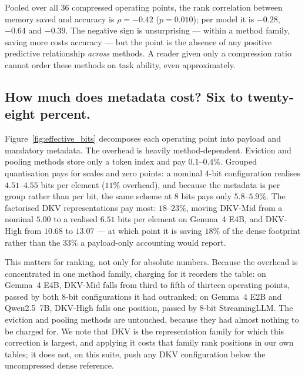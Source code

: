 \documentclass{article}
\theoremstyle{definition}
\newcommand{\Sres}{\mathcal{S}_{\text{res}}}
\newcommand{\beff}{b_{\text{eff}}}
\begin{document}
Pooled over all $36$ compressed operating points, the rank correlation between memory saved and accuracy is $\rho = {-}0.42$ ($p = 0.010$); per model it is ${-}0.28$, ${-}0.64$ and ${-}0.39$. The negative sign is unsurprising --- within a method family, saving more costs accuracy --- but the point is the absence of any positive predictive relationship \emph{across} methods. A reader given only a compression ratio cannot order these methods on task ability, even approximately.

\begin{table}[t]
\centering
\small
\setlength{\tabcolsep}{5.0pt}
\caption{\textbf{Part 1: algorithmic representation utility at every operating point.} $b_{\text{pay}}$ is the compressed payload alone --- the quantity conventionally reported --- and $\beff$ additionally charges mandatory metadata (Definition~\ref{def:beff}); ``meta'' is the metadata share of realised footprint. $\Sres = 0.70\,Q_{\text{abs}} + 0.30\,R_{\text{mem}}$ on $\beff$. Best $\Sres$ per model in \textbf{bold}. Paired coverage was $1.00$ throughout.}
\label{tab:part1}

\end{table}

\subsection{How much does metadata cost? Six to twenty-eight percent.}
\label{sec:res_metadata}

Figure~\ref{fig:effective_bits} decomposes each operating point into payload and mandatory metadata. The overhead is heavily method-dependent. Eviction and pooling methods store only a token index and pay $0.1$--$0.4\%$. Grouped quantisation pays for scales and zero points: a nominal $4$-bit configuration realises $4.51$--$4.55$ bits per element ($11\%$ overhead), and because the metadata is per group rather than per bit, the same scheme at $8$ bits pays only $5.8$--$5.9\%$. The factorised DKV representations pay most: $18$--$23\%$, moving DKV-Mid from a nominal $5.00$ to a realised $6.51$ bits per element on Gemma~4 E4B, and DKV-High from $10.68$ to $13.07$ --- at which point it is saving $18\%$ of the dense footprint rather than the $33\%$ a payload-only accounting would report.

This matters for ranking, not only for absolute numbers. Because the overhead is concentrated in one method family, charging for it reorders the table: on Gemma~4 E4B, DKV-Mid falls from third to fifth of thirteen operating points, passed by both 8-bit configurations it had outranked; on Gemma~4 E2B and Qwen2.5~7B, DKV-High falls one position, passed by 8-bit StreamingLLM. The eviction and pooling methods are untouched, because they had almost nothing to be charged for. We note that DKV is the representation family for which this correction is largest, and applying it costs that family rank positions in our own tables; it does not, on this suite, push any DKV configuration below the uncompressed dense reference.
\end{document}
